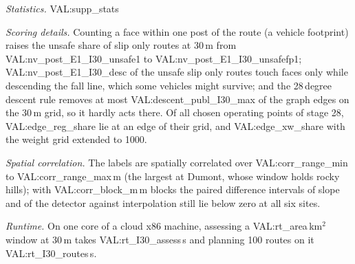 \textit{Statistics.} {{VAL:supp_stats}}

\textit{Scoring details.} Counting a face within one post of the route (a vehicle footprint) raises the unsafe share of slip only routes at 30\,m from {{VAL:nv_post_E1_I30_unsafe1}} to {{VAL:nv_post_E1_I30_unsafefp1}}; {{VAL:nv_post_E1_I30_desc}} of the unsafe slip only routes touch faces only while descending the fall line, which some vehicles might survive; and the 28\,degree descent rule removes at most {{VAL:descent_publ_I30_max}} of the graph edges on the 30\,m grid, so it hardly acts there. Of all chosen operating points of stage 28, {{VAL:edge_reg_share}} lie at an edge of their grid, and {{VAL:edge_xw_share}} with the weight grid extended to 1000.

\textit{Spatial correlation.} The labels are spatially correlated over {{VAL:corr_range_min}} to {{VAL:corr_range_max}}\,m (the largest at Dumont, whose window holds rocky hills); with {{VAL:corr_block_m}}\,m blocks the paired difference intervals of slope and of the detector against interpolation still lie below zero at all six sites.

\textit{Runtime.} On one core of a cloud x86 machine, assessing a {{VAL:rt_area}}\,km$^2$ window at 30\,m takes {{VAL:rt_I30_assess}}\,s and planning 100 routes on it {{VAL:rt_I30_routes}}\,s.
